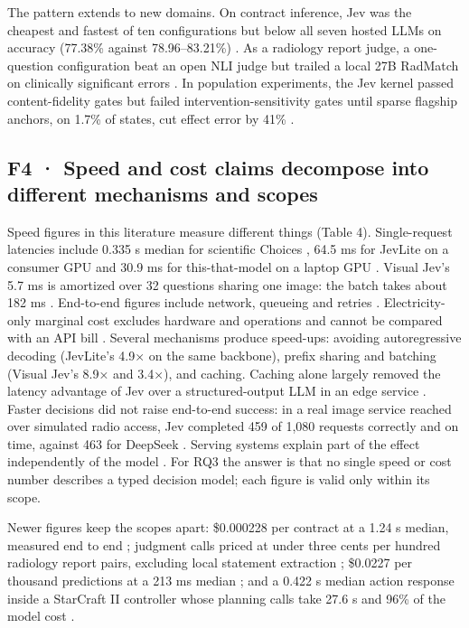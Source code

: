 The pattern extends to new domains. On contract inference, Jev was the cheapest and fastest of ten configurations but below all seven hosted LLMs on accuracy (77.38\% against 78.96–83.21\%) \citep{arxiv2609_27678}. As a radiology report judge, a one-question configuration beat an open NLI judge but trailed a local 27B RadMatch on clinically significant errors \citep{arxiv2609_27607}. In population experiments, the Jev kernel passed content-fidelity gates but failed intervention-sensitivity gates until sparse flagship anchors, on 1.7\% of states, cut effect error by 41\% \citep{arxiv2609_27535}.

\subsection{F4 · Speed and cost claims decompose into different mechanisms and scopes}

Speed figures in this literature measure different things (Table 4). Single-request latencies include 0.335 s median for scientific Choices \citep{arxiv2609_24965}, 64.5 ms for JevLite on a consumer GPU \citep{arxiv2609_23959} and 30.9 ms for this-that-model on a laptop GPU \citep{arxiv2609_23886}. Visual Jev's 5.7 ms is amortized over 32 questions sharing one image: the batch takes about 182 ms \citep{arxiv2609_25845}. End-to-end figures include network, queueing and retries \citep{arxiv2609_26550,arxiv2609_22753}. Electricity-only marginal cost excludes hardware and operations and cannot be compared with an API bill \citep{arxiv2609_23886}. Several mechanisms produce speed-ups: avoiding autoregressive decoding (JevLite's 4.9× on the same backbone), prefix sharing and batching (Visual Jev's 8.9× and 3.4×), and caching. Caching alone largely removed the latency advantage of Jev over a structured-output LLM in an edge service \citep{arxiv2609_22753}. Faster decisions did not raise end-to-end success: in a real image service reached over simulated radio access, Jev completed 459 of 1,080 requests correctly and on time, against 463 for DeepSeek \citep{arxiv2609_23136}. Serving systems explain part of the effect independently of the model \citep{arxiv2312_07104}. For RQ3 the answer is that no single speed or cost number describes a typed decision model; each figure is valid only within its scope.

Newer figures keep the scopes apart: \$0.000228 per contract at a 1.24 s median, measured end to end \citep{arxiv2609_27678}; judgment calls priced at under three cents per hundred radiology report pairs, excluding local statement extraction \citep{arxiv2609_27607}; \$0.0227 per thousand predictions at a 213 ms median \citep{arxiv2609_27535}; and a 0.422 s median action response inside a StarCraft II controller whose planning calls take 27.6 s and 96\% of the model cost \citep{arxiv2609_27331}.


